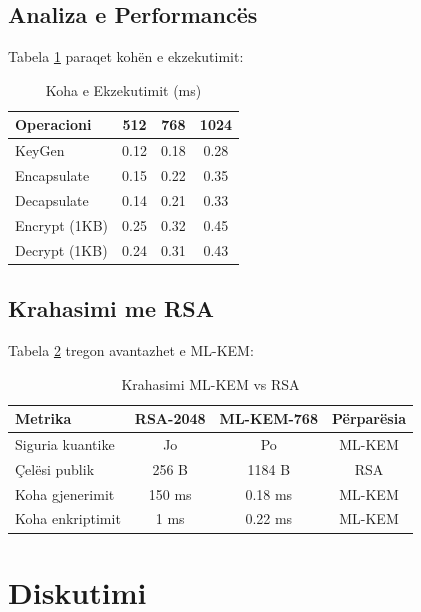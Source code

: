 \documentclass[conference]{IEEEtran}
\begin{document}
\subsection{Analiza e Performancës}

Tabela \ref{tab:performance} paraqet kohën e ekzekutimit:

\begin{table}[htbp]
\caption{Koha e Ekzekutimit (ms)}
\label{tab:performance}
\begin{center}
\begin{tabular}{|l|c|c|c|}
\hline
\textbf{Operacioni} & \textbf{512} & \textbf{768} & \textbf{1024} \\
\hline
KeyGen & 0.12 & 0.18 & 0.28 \\
Encapsulate & 0.15 & 0.22 & 0.35 \\
Decapsulate & 0.14 & 0.21 & 0.33 \\
Encrypt (1KB) & 0.25 & 0.32 & 0.45 \\
Decrypt (1KB) & 0.24 & 0.31 & 0.43 \\
\hline
\end{tabular}
\end{center}
\end{table}

\subsection{Krahasimi me RSA}

Tabela \ref{tab:comparison} tregon avantazhet e ML-KEM:

\begin{table}[htbp]
\caption{Krahasimi ML-KEM vs RSA}
\label{tab:comparison}
\begin{center}
\begin{tabular}{|l|c|c|c|}
\hline
\textbf{Metrika} & \textbf{RSA-2048} & \textbf{ML-KEM-768} & \textbf{Përparësia} \\
\hline
Siguria kuantike & Jo & Po & ML-KEM \\
Çelësi publik & 256 B & 1184 B & RSA \\
Koha gjenerimit & 150 ms & 0.18 ms & ML-KEM \\
Koha enkriptimit & 1 ms & 0.22 ms & ML-KEM \\
\hline
\end{tabular}
\end{center}
\end{table}

\section{Diskutimi}
\end{document}
